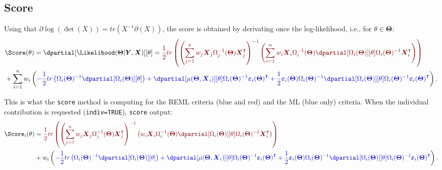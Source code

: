 \documentclass[12pt]{article}
\newcommand{\darkblue}{blue!80!black}
\newcommand{\darkred}{red!50!black}
\newcommand\trans[1]{{#1}^\intercal}%
\newcommand{\param}{\Theta}
\newcommand{\Vparam}{\boldsymbol{\param}}
\newcommand{\VX}{\boldsymbol{X}}
\newcommand{\VY}{\boldsymbol{Y}}
\newcommand{\Vvarepsilon}{\boldsymbol{\varepsilon}}
\begin{document}
\clearpage
\subsection{Score}
\label{sec:orgb4ba06e}

 Using that \(\partial \log(\det(X))=tr(X^{-1}\partial(X))\), the
score is obtained by derivating once the log-likelihood, i.e., for
\(\theta \in \Vparam\):
\begin{align*}
   &\Score(\theta) = \dpartial[\Likelihood(\Vparam|\VY,\VX)][\theta]
= \textcolor{\darkred}{ \frac{1}{2} tr \left( \left(\sum_{j=1}^n w_j \VX_j \Omega_j^{-1}(\Vparam) \trans{\VX}_j\right)^{-1} \left(\sum_{i=1}^n w_i \VX_i \Omega_i^{-1}(\Vparam) \dpartial[\Omega_i(\Vparam)][\theta] \Omega_i(\Vparam)^{-1} \trans{\VX}_i\right)  \right) } \\
&+ \sum_{i=1}^n w_i \left( \textcolor{\darkblue}{ -\frac{1}{2} tr\left(\Omega_i(\Vparam)^{-1} \dpartial[\Omega_i(\Vparam)][\theta]\right) + \dpartial[\mu(\Vparam,\VX_i)][\theta] \Omega_i(\Vparam)^{-1} \trans{\Vvarepsilon_i(\Vparam)} 
+ \frac{1}{2} \Vvarepsilon_i(\Vparam) \Omega_i(\Vparam)^{-1} \dpartial[\Omega_i(\Vparam)][\theta] \Omega_i(\Vparam)^{-1} \trans{\Vvarepsilon_i(\Vparam)} } \right).
\end{align*}

This is what the \texttt{score} method is computing for the REML criteria
(blue and red) and the ML (blue only) criteria. When the individual
contribution is requested (\texttt{indiv=TRUE}), \texttt{score} output:
\begin{align*}
   \Score_i(\theta) &
= \textcolor{\darkred}{ \frac{1}{2} tr \left( \left(\sum_{j=1}^n w_j \VX_j \Omega_j^{-1}(\Vparam) \trans{\VX}_j\right)^{-1} \left(w_i \VX_i \Omega_i^{-1}(\Vparam) \dpartial[\Omega_i(\Vparam)][\theta] \Omega_i(\Vparam)^{-1} \trans{\VX}_i\right)  \right) } \\
&+ w_i \left( \textcolor{\darkblue}{ -\frac{1}{2} tr\left(\Omega_i(\Vparam)^{-1} \dpartial[\Omega_i(\Vparam)][\theta]\right) + \dpartial[\mu(\Vparam,\VX_i)][\theta] \Omega_i(\Vparam)^{-1} \trans{\Vvarepsilon_i(\Vparam)}
+ \frac{1}{2} \Vvarepsilon_i(\Vparam) \Omega_i(\Vparam)^{-1} \dpartial[\Omega_i(\Vparam)][\theta] \Omega_i(\Vparam)^{-1} \trans{\Vvarepsilon_i(\Vparam)} } \right).
\end{align*}
\end{document}
